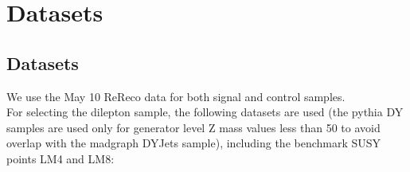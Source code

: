
\section{Datasets}
\label{sec:datasets}

\subsection{Datasets}

We use the May 10 ReReco data for both signal and control samples.%
\\
For selecting the dilepton sample, the following datasets are used (the pythia DY samples are used only for generator level Z mass values less than 50 to avoid overlap with the madgraph DYJets sample), including the benchmark SUSY points LM4 and LM8:


